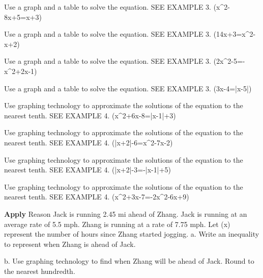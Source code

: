 \documentclass{article}
\newenvironment{practice}[2]{}{}        %
\newcommand{\answer}[1]{}               %
\begin{document}
\begin{practice}{22}{1}
Use a graph and a table to solve the equation. SEE EXAMPLE 3.
(x^2-8x+5=x+3)
\answer{(x\approx0.228) and (x\approx8.772)}
\end{practice}
\begin{practice}{23}{1}
Use a graph and a table to solve the equation. SEE EXAMPLE 3.
(\frac14x+3=x^2-x+2)
\answer{(x\approx-0.554) and (x\approx1.804)}
\end{practice}
\begin{practice}{24}{1}
Use a graph and a table to solve the equation. SEE EXAMPLE 3.
(2x^2-5=-x^2+2x-1)
\answer{(x\approx-0.869) and (x\approx1.535)}
\end{practice}
\begin{practice}{25}{1}
Use a graph and a table to solve the equation. SEE EXAMPLE 3.
(3x-4=|x-5|)
\answer{(x\approx1.857)}
\end{practice}
\begin{practice}{26}{1}
Use graphing technology to approximate the solutions of the equation to the nearest tenth. SEE EXAMPLE 4.
(x^2+6x-8=|x-1|+3)
\answer{(x\approx-8.4) and (x\approx1.5)}
\end{practice}
\begin{practice}{27}{1}
Use graphing technology to approximate the solutions of the equation to the nearest tenth. SEE EXAMPLE 4.
(|x+2|-6=x^2-7x-2)
\answer{(x\approx0.3) and (x\approx7.7)}
\end{practice}
\begin{practice}{28}{1}
Use graphing technology to approximate the solutions of the equation to the nearest tenth. SEE EXAMPLE 4.
(|x+2|-3=-|x-1|+5)
\answer{(x\approx-6.2) and (x\approx7.2)}
\end{practice}
\begin{practice}{29}{1}
Use graphing technology to approximate the solutions of the equation to the nearest tenth. SEE EXAMPLE 4.
(x^2+3x-7=-2x^2-6x+9)
\answer{(x\approx-4.3) and (x\approx1.3)}
\end{practice}
\begin{practice}{30}{2}
\textbf{Apply} Reason Jack is running 2.45 mi ahead of Zhang. Jack is running at an average rate of 5.5 mph. Zhang is running at a rate of 7.75 mph. Let (x) represent the number of hours since Zhang started jogging.
a. Write an inequality to represent when Zhang is ahead of Jack.
\answer{(7.75x>5.5x+2.45)}
b. Use graphing technology to find when Zhang will be ahead of Jack. Round to the nearest hundredth.
\answer{Zhang will be ahead of Jack after about 1.09 h.}
\end{practice}
\end{document}
